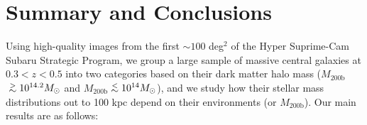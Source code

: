 \documentclass[a4paper,fleqn,usenatbib]{mnras}
\def\simlt{\lower.5ex\hbox{$\; \buildrel < \over {\sim} \;$}}
\def\simgt{\lower.5ex\hbox{$\; \buildrel > \over {\sim} \;$}}
\def\mhalo{{$M_{\mathrm{200b}}$}}
\begin{document}


\section{Summary and Conclusions}
    \label{sec:summary}
    
    Using high-quality images from the first $\sim100$ deg$^2$ of the 
    Hyper Suprime-Cam Subaru Strategic Program, we group a large sample of massive 
    central galaxies at $0.3 < z < 0.5$ into two categories based on their dark matter
    halo mass (\mhalo{}$\simgt 10^{14.2} M_{\odot}$ and 
    \mhalo{}$\simlt 10^{14} M_{\odot}$), and we study how their stellar mass 
    distributions out to 100 kpc depend on their environments (or \mhalo{}). 
    Our main results are as follows:  
    
\end{document}
